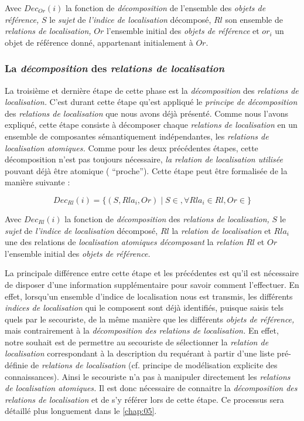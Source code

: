 Avec \(Dec_{Or}(i)\) la fonction de \emph{décomposition} de l'ensemble
des \emph{objets de référence,} \(S\) le \emph{sujet} de \emph{l'indice
  de localisation} décomposé, \(Rl\) son ensemble de \emph{relations
  de localisation,} \(Or\) l'ensemble initial des \emph{objets de
  référence} et \(or_i\) un objet de référence donné, appartenant
initialement à \(Or\).

\subsubsection{La \emph{décomposition} des \emph{relations de localisation}}

La troisième et dernière étape de cette phase est la
\emph{décomposition} des \emph{relations de localisation.} C'est
durant cette étape qu'est appliqué le \emph{principe de décomposition}
des \emph{relations de localisation} que nous avons déjà
présenté. Comme nous l'avons expliqué, cette étape consiste à
décomposer chaque \emph{relations de localisation} en un ensemble de
composantes sémantiquement indépendantes, les \emph{relations de
  localisation atomiques.} Comme pour les deux précédentes étapes,
cette décomposition n'est pas toujours nécessaire, \emph{la relation
  de localisation utilisée} pouvant déjà être atomique (\eg
\enquote{proche}). Cette étape peut être formalisée de la manière
suivante :

\begin{equation}
  Dec_{Rl}(i) = \{(S,Rla_i,Or) \mid S \in, \forall Rla_i \in Rl,  Or \in \} 
\end{equation}

Avec \(Dec_{Rl}(i)\) la fonction de \emph{décomposition} des
\emph{relations de localisation,} \(S\) le \emph{sujet} de
\emph{l'indice de localisation} décomposé, \(Rl\) la \emph{relation de
  localisation} et \(Rla_i\) une des relations de \emph{localisation
  atomiques décomposant} la \emph{relation} \(Rl\) et \(Or\)
l'ensemble initial des \emph{objets de référence.}


La principale différence entre cette étape et les précédentes est
qu'il est nécessaire de disposer d'une information supplémentaire pour
savoir comment l'effectuer. En effet, lorsqu'un ensemble d'indice de
localisation nous est transmis, les différents \emph{indices de
  localisation} qui le composent sont déjà identifiés, puisque saisis
tels quels par le secouriste, de la même manière que les différents
\emph{objets de référence,} mais contrairement à la
\emph{décomposition des relations de localisation.} En effet, notre
souhait est de permettre au secouriste de sélectionner la
\emph{relation de localisation} correspondant à la description du
requérant à partir d'une liste pré-définie de \emph{relations de
  localisation} (cf. principe de modélisation explicite des
connaissances). Ainsi le secouriste n'a pas à manipuler directement
les \emph{relations de localisation atomiques.} Il est donc nécessaire
de connaitre la \emph{décomposition des relations de localisation} et
de s'y référer lors de cette étape. Ce processus sera détaillé plus
longuement dans le \autoref{chap:05}.

